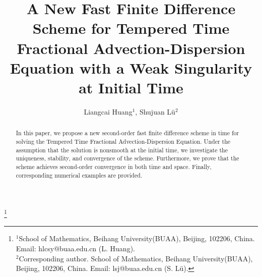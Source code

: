 \documentclass[10pt, reqno]{amsart}
\theoremstyle{remark}
\theoremstyle{definition}
\numberwithin{table}{section}
\begin{document}
	
	\graphicspath{{./figures/}}
	
\title[Fast Finite Difference Scheme for Tempered Time Fractional]
	 {A New Fast Finite Difference Scheme for Tempered Time Fractional Advection-Dispersion Equation with a Weak Singularity at Initial Time}
	\author[Liangcai Huang]
{\;\; Liangcai Huang${}^1$,  \;\; Shujuan Lü${}^2$ }
	
	\thanks{${}^{1}$School of Mathematics,  Beihang University(BUAA),  Beijing,  102206,  China.  Email: hlcsy@buaa.edu.cn (L. Huang).  \\
	 \indent ${}^2$Corresponding author.  School of Mathematics,  Beihang University(BUAA),  Beijing,  102206,  China.  Email: lsj@buaa.edu.cn (S. Lü). 
			}

\begin{abstract}
In this paper,  we propose a new second-order fast finite difference scheme in time for solving the Tempered Time Fractional Advection-Dispersion Equation.  Under the assumption that the solution is nonsmooth at the initial time,  we investigate the uniqueness,  stability,  and convergence of the scheme.  Furthermore,  we prove that the scheme achieves second-order convergence in both time and space.  Finally,  corresponding numerical examples are provided. 
\end{abstract}
%

\maketitle


\end{document}
